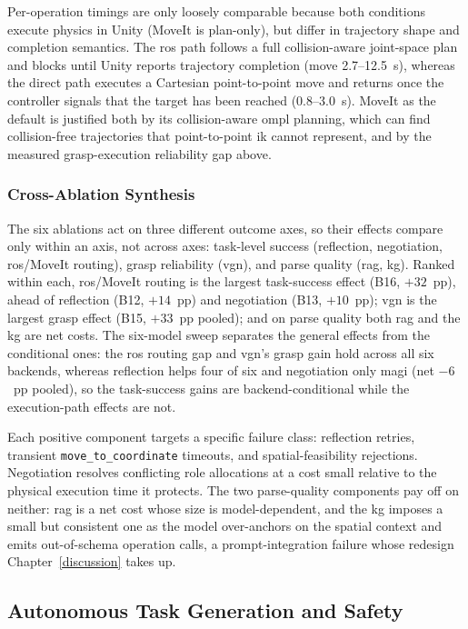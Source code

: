 Per-operation timings are only loosely comparable because both conditions execute physics in Unity (MoveIt is plan-only), but differ in trajectory shape and completion semantics. The \gls{ros} path follows a full collision-aware joint-space plan and blocks until Unity reports trajectory completion (move 2.7–12.5~s), whereas the direct path executes a Cartesian point-to-point move and returns once the controller signals that the target has been reached (0.8–3.0~s). MoveIt as the default is justified both by its collision-aware \gls{ompl} planning, which can find collision-free trajectories that point-to-point \gls{ik} cannot represent, and by the measured grasp-execution reliability gap above.

\subsubsection{Cross-Ablation Synthesis}\label{sec:results-ablation-synthesis}
The six ablations act on three different outcome axes, so their effects compare only within an axis, not across axes: task-level success (reflection, negotiation, \gls{ros}/MoveIt routing), grasp reliability (\gls{vgn}), and parse quality (\gls{rag}, \gls{kg}). Ranked within each, \gls{ros}/MoveIt routing is the largest task-success effect (B16, $+32$~pp), ahead of reflection (B12, $+14$~pp) and negotiation (B13, $+10$~pp); \gls{vgn} is the largest grasp effect (B15, $+33$~pp pooled); and on parse quality both \gls{rag} and the \gls{kg} are net costs. The six-model sweep separates the general effects from the conditional ones: the \gls{ros} routing gap and \gls{vgn}'s grasp gain hold across all six backends, whereas reflection helps four of six and negotiation only \gls{magi} (net $-6$~pp pooled), so the task-success gains are backend-conditional while the execution-path effects are not.

Each positive component targets a specific failure class: reflection retries, transient \texttt{move\_to\_coordinate} timeouts, and spatial-feasibility rejections. Negotiation resolves conflicting role allocations at a cost small relative to the physical execution time it protects. The two parse-quality components pay off on neither: \gls{rag} is a net cost whose size is model-dependent, and the \gls{kg} imposes a small but consistent one as the model over-anchors on the spatial context and emits out-of-schema operation calls, a prompt-integration failure whose redesign Chapter~\ref{discussion} takes up.

\subsection{Autonomous Task Generation and Safety}\label{sec:results-autort}

